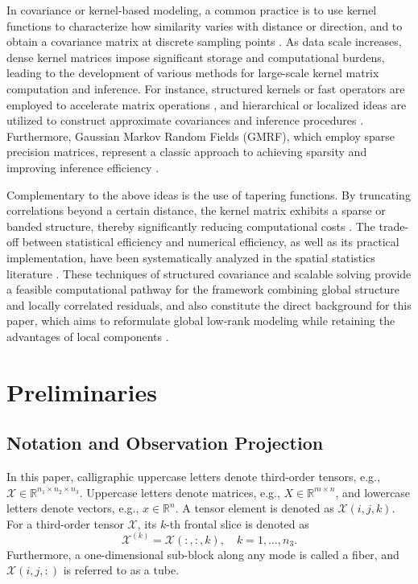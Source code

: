 \documentclass[a4paper,12pt]{article}
\numberwithin{equation}{section}
\numberwithin{algorithm}{section}
\theoremstyle{remark}
\theoremstyle{definition}
\begin{document}
In covariance or kernel-based modeling, a common practice is to use kernel functions to characterize how similarity varies with distance or direction, and to obtain a covariance matrix at discrete sampling points \cite{rasmussen2006gpml}. As data scale increases, dense kernel matrices impose significant storage and computational burdens, leading to the development of various methods for large-scale kernel matrix computation and inference. For instance, structured kernels or fast operators are employed to accelerate matrix operations \cite{wilson2015scalablegp}, and hierarchical or localized ideas are utilized to construct approximate covariances and inference procedures \cite{katzfuss2013bayesian,sang2012fullscale}. Furthermore, Gaussian Markov Random Fields (GMRF), which employ sparse precision matrices, represent a classic approach to achieving sparsity and improving inference efficiency \cite{rue2005gmrf}.



Complementary to the above ideas is the use of tapering functions. By truncating correlations beyond a certain distance, the kernel matrix exhibits a sparse or banded structure, thereby significantly reducing computational costs \cite{gneiting2002compact,furrer2006tapering}. The trade-off between statistical efficiency and numerical efficiency, as well as its practical implementation, have been systematically analyzed in the spatial statistics literature \cite{kaufman2008tapering}. These techniques of structured covariance and scalable solving provide a feasible computational pathway for the framework combining global structure and locally correlated residuals, and also constitute the direct background for this paper, which aims to reformulate global low-rank modeling while retaining the advantages of local components \cite{lei2024glskf}.





\section{Preliminaries}

\subsection{Notation and Observation Projection}
In this paper, calligraphic uppercase letters denote third-order tensors, e.g., $\mathcal{X}\in\mathbb{R}^{n_1\times n_2\times n_3}$. Uppercase letters denote matrices, e.g., $X\in\mathbb{R}^{m\times n}$, and lowercase letters denote vectors, e.g., $x\in\mathbb{R}^{n}$. A tensor element is denoted as $\mathcal{X}(i,j,k)$. For a third-order tensor $\mathcal{X}$, its $k$-th frontal slice is denoted as
\[
\mathcal{X}^{(k)}=\mathcal{X}(:,:,k),\quad k=1,\ldots,n_3.
\]
Furthermore, a one-dimensional sub-block along any mode is called a fiber, and $\mathcal{X}(i,j,:)$ is referred to as a tube.
\end{document}
